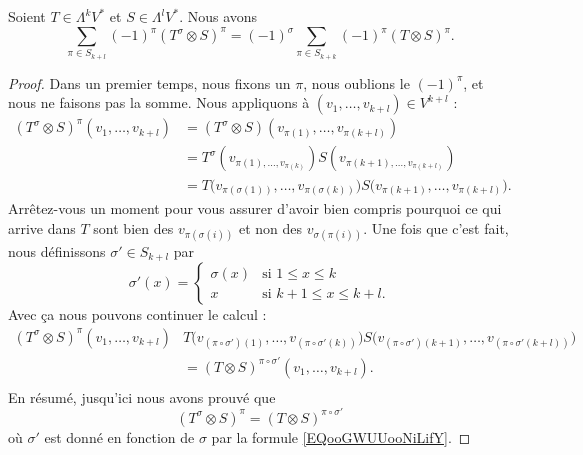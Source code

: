 \begin{lemma}		\label{LEMooERYDooAifUdG}
	Soient \( T\in \Lambda^kV^*\) et \( S\in \Lambda^lV^*\). Nous avons
	\begin{equation}
		\sum_{\pi\in S_{k+l}}(-1)^{\pi}(T^{\sigma}\otimes S)^{\pi}=(-1)^{\sigma}\sum_{\pi\in S_{k+k}}(-1)^{\pi}(T\otimes S)^{\pi}.
	\end{equation}
\end{lemma}

\begin{proof}
	Dans un premier temps, nous fixons un \( \pi\), nous oublions le \( (-1)^{\pi}\), et nous ne faisons pas la somme. Nous appliquons à \( (v_1,\ldots,v_{k+l})\in V^{k+l}\) :
	\begin{subequations}
		\begin{align}
			(T^{\sigma}\otimes S)^{\pi}(v_1,\ldots,v_{k+l}) & =(T^{\sigma}\otimes S)(v_{\pi(1)},\ldots, v_{\pi(k+l)})                                                  \\
			                                                & =T^{\sigma}(v_{\pi(1),\ldots,v_{\pi(k)}})S(v_{\pi(k+1),\ldots,v_{\pi(k+l)}})                             \\
			                                                & =T\big( v_{\pi(\sigma(1))},\ldots,v_{\pi(\sigma(k))} \big)S\big( v_{\pi(k+1)},\ldots,v_{\pi(k+l)} \big).
		\end{align}
	\end{subequations}
	Arrêtez-vous un moment pour vous assurer d'avoir bien compris pourquoi ce qui arrive dans \( T\) sont bien des \( v_{\pi(\sigma(i))}\) et non des \( v_{\sigma(\pi(i))}\). Une fois que c'est fait, nous définissons \( \sigma'\in S_{k+l}\) par
	\begin{equation}		\label{EQooGWUUooNiLifY}
		\sigma'(x)=\begin{cases}
			\sigma(x) & \text{si } 1\leq x\leq k     \\
			x         & \text{si }k+1\leq x\leq k+l.
		\end{cases}
	\end{equation}
	Avec ça nous pouvons continuer le calcul :
	\begin{subequations}
		\begin{align}
			(T^{\sigma}\otimes S)^{\pi}(v_1,\ldots,v_{k+l}) & T\big( v_{(\pi\circ\sigma')(1)},\ldots,v_{(\pi\circ \sigma'(k))} \big)S\big( v_{(\pi\circ \sigma')(k+1)},\ldots,v_{(\pi\circ\sigma'(k+l))} \big) \\
			                                                & =(T\otimes S)^{\pi\circ\sigma'}(v_1,\ldots,v_{k+l}).                                                                                             \\
		\end{align}
	\end{subequations}
	En résumé, jusqu'ici nous avons prouvé que
	\begin{equation}
		(T^{\sigma}\otimes S)^{\pi}=(T\otimes S)^{\pi\circ \sigma'}
	\end{equation}
	où \( \sigma'\) est donné en fonction de \( \sigma\) par la formule \eqref{EQooGWUUooNiLifY}.


\end{proof}
